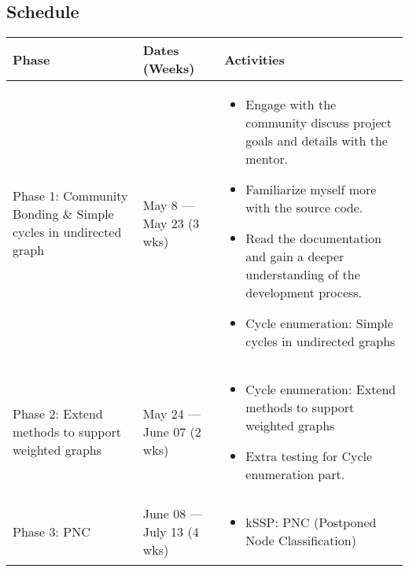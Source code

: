 \subsection{Schedule}

\begin{table}[H]
    \centering
    \footnotesize
    \begin{tabularx}{\textwidth}{|p{2.5cm}|p{2.5cm}|X|}
        \hline
        \textbf{Phase}                                                  & \textbf{Dates (Weeks)}            & \textbf{Activities} \\
        \hline
        Phase 1: Community Bonding \& Simple cycles in undirected graph & May 8 --- May 23 (3 wks)          &
        \begin{itemize}
            \item Engage with the community discuss project goals and details with the mentor.
            \item Familiarize myself more with the source code.
            \item Read the documentation and gain a deeper understanding of the development
                  process.
            \item Cycle enumeration: Simple cycles in undirected graphs
        \end{itemize}                                         \\
        \hline
        Phase 2: Extend methods to support weighted graphs              & May 24 --- June 07 (2 wks)        &
        \begin{itemize}
            \item Cycle enumeration: Extend methods to support weighted graphs
            \item Extra testing for Cycle enumeration part.
        \end{itemize}                                                         \\
        \hline
        Phase 3: PNC                                                    & June 08 --- July 13 (4 wks)       &
        \begin{itemize}
            \item kSSP: PNC (Postponed Node Classification)
        \end{itemize}                                                                            \\
        \hline

\end{tabularx}
\end{table}
